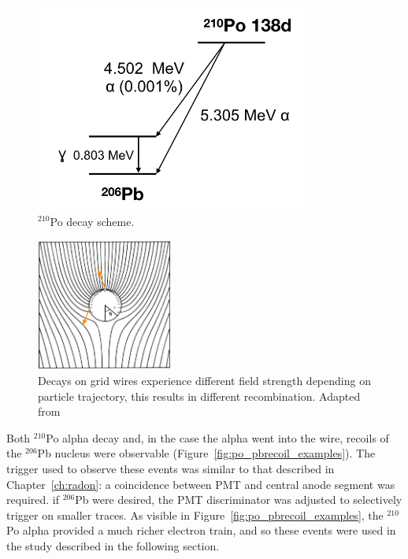 \begin{figure}[htbp]
\begin{center}
\includegraphics[width=0.8\textwidth]{figures/etrains/po_decay.png}
\caption{$^{210}$Po decay scheme. }
\label{fig:po_decay}
\end{center}
\end{figure}

\begin{figure}[htbp]
\begin{center}
\includegraphics[width=0.4\textwidth]{figures/etrains/field_variation.png}
\caption{Decays on grid wires experience different field strength depending on particle trajectory, this results in different recombination. Adapted from \cite{Blum2008} }
\label{fig:field_variation}
\end{center}
\end{figure}

Both $^{210}$Po alpha decay and, in the case the alpha went into the wire, recoils of the $^{206}$Pb nucleus were observable (Figure~\ref{fig:po_pbrecoil_examples}). The trigger used to observe these events was similar to that described in Chapter~\ref{ch:radon}: a coincidence between \ac{PMT} and central anode segment was required. if $^{206}$Pb were desired, the \ac{PMT} discriminator was adjusted to selectively trigger on smaller traces. As visible in Figure~\ref{fig:po_pbrecoil_examples}, the $^{210}$Po alpha provided a much richer electron train, and so these events were used in the study described in the following section.

